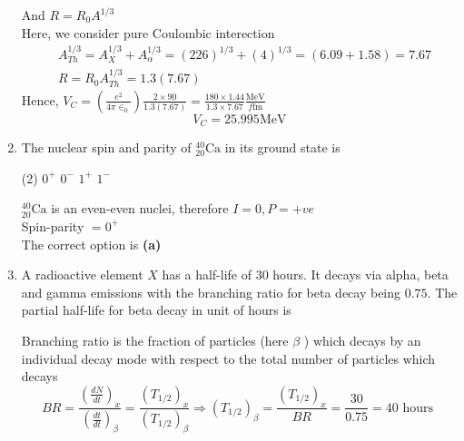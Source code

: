 \begin{enumerate}
\begin{answer}
And $R=R_{0} A^{1 / 3}$\\
Here, we consider pure Coulombic interection
\begin{align*}
	&A_{T h}^{1 / 3}=A_{X}^{1 / 3}+A_{\alpha}^{1 / 3}=(226)^{1 / 3}+(4)^{1 / 3}=(6.09+1.58)=7.67 \\
	&R=R_{0} A_{T h}^{1 / 3}=1.3(7.67)
\end{align*}
Hence, $V_{C}=\left(\frac{e^{2}}{4 \pi \in_{0}}\right) \frac{2 \times 90}{1.3(7.67)}=\frac{180 \times 1.44}{1.3 \times 7.67} \frac{\mathrm{MeV}}{f \mathrm{fm}}$
$$
V_{C}=25.995 \mathrm{MeV}
$$	
\end{answer}
\item The nuclear spin and parity of ${ }_{20}^{40} \mathrm{Ca}$ in its ground state is
{}
\begin{tasks}(2)
	\task[\textbf{A.}] $0^{+}$
	\task[\textbf{B.}] $0^{-}$
	\task[\textbf{C.}] $1^{+}$
	\task[\textbf{D.}] $1^{-}$
\end{tasks}
\begin{answer}
	${ }_{20}^{40} \mathrm{Ca}$ is an even-even nuclei, therefore $I=0, P=+v e$\\
	Spin-parity $=0^{+}$\\
	The correct option is \textbf{(a)}
\end{answer}
\item A radioactive element $X$ has a half-life of 30 hours. It decays via alpha, beta and gamma emissions with the branching ratio for beta decay being $0.75$. The partial half-life for beta decay in unit of hours is
{}
\begin{answer}
 Branching ratio is the fraction of particles (here $\beta$ ) which decays by an individual decay mode with respect to the total number of particles which decays
 $$B R=\frac{\left(\frac{d N}{d t}\right)_{x}}{\left(\frac{d t}{d t}\right)_{\beta}}=\frac{\left(T_{1 / 2}\right)_{x}}{\left(T_{1 / 2}\right)_{\beta}} \Rightarrow\left(T_{1 / 2}\right)_{\beta}=\frac{\left(T_{1 / 2}\right)_{x}}{B R}=\frac{30}{0.75}=40 \text { hours }$$	
\end{answer}
\end{enumerate}
